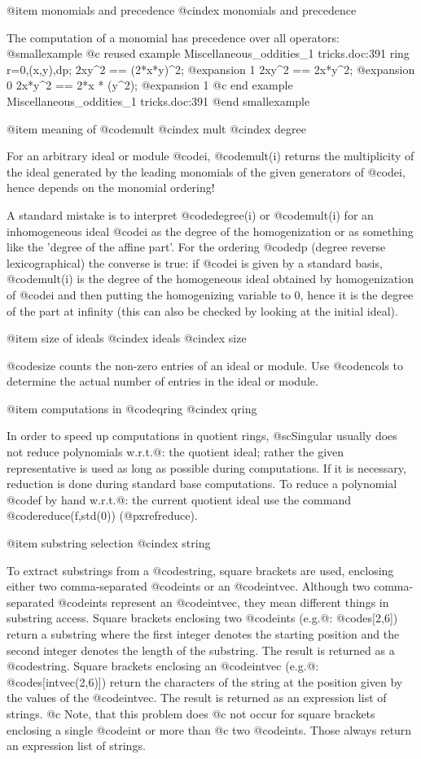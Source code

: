 @item monomials and precedence
@cindex monomials and precedence

The computation of a monomial has precedence over all operators:
@smallexample
@c reused example Miscellaneous_oddities_1 tricks.doc:391 
  ring r=0,(x,y),dp;
  2xy^2 == (2*x*y)^2;
@expansion{} 1
  2xy^2 == 2x*y^2;
@expansion{} 0
  2x*y^2 == 2*x * (y^2);
@expansion{} 1
@c end example Miscellaneous_oddities_1 tricks.doc:391
@end smallexample

@item meaning of @code{mult}
@cindex mult
@cindex degree

For an arbitrary ideal or module @code{i}, @code{mult(i)} returns the
multiplicity of the ideal generated by the leading monomials of the
given generators of @code{i}, hence depends on the monomial ordering!

A standard mistake is to interpret @code{degree(i)} or @code{mult(i)}
for an inhomogeneous ideal @code{i} as the degree of the homogenization
or as something like the 'degree of the affine part'. For the ordering
@code{dp} (degree reverse lexicographical) the converse is true: if
@code{i} is given by a standard basis, @code{mult(i)} is the degree of
the homogeneous ideal obtained by homogenization of @code{i} and then
putting the homogenizing variable to 0, hence it is the degree of the
part at infinity (this can also be checked by looking at the initial
ideal).

@item size of ideals
@cindex ideals
@cindex size

@code{size} counts the non-zero entries of an ideal or module. Use
@code{ncols} to determine the actual number of entries in the ideal or module.

@item computations in @code{qring}
@cindex qring

In order to speed up computations in quotient rings, @sc{Singular}
usually does not reduce polynomials w.r.t.@: the quotient ideal; rather
the given representative is used as long as possible during
computations. If it is necessary, reduction is done during standard base
computations. To reduce a polynomial @code{f} by hand w.r.t.@: the
current quotient ideal use the command @code{reduce(f,std(0))}
(@pxref{reduce}).

@item substring selection
@cindex string

To extract substrings from a @code{string}, square brackets are used,
enclosing either two comma-separated @code{int}s or an
@code{intvec}. Although two comma-separated @code{int}s represent an
@code{intvec}, they mean different things in substring access. Square
brackets enclosing two @code{int}s (e.g.@: @code{s[2,6]}) return a
substring where the first integer denotes the starting position and the
second integer denotes the length of the substring. The result is
returned as a @code{string}. Square brackets enclosing an @code{intvec}
(e.g.@: @code{s[intvec(2,6)]}) return the characters of the string at the
position given by the values of the @code{intvec}. The result is
returned as an expression list of strings. 
@c  Note, that this problem does
@c  not occur for square brackets enclosing a single @code{int} or more than
@c  two @code{int}s. Those always return an expression list of strings.

